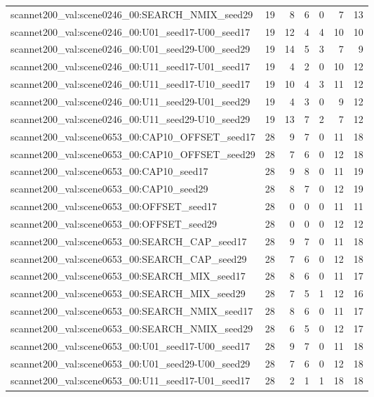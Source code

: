 \begin{table}[t]
\begin{tabular}{lrrrrrr}
scannet200\_val:scene0246\_00:SEARCH\_NMIX\_seed29 & 19 & 8 & 6 & 0 & 7 & 13 \\
scannet200\_val:scene0246\_00:U01\_seed17-U00\_seed17 & 19 & 12 & 4 & 4 & 10 & 10 \\
scannet200\_val:scene0246\_00:U01\_seed29-U00\_seed29 & 19 & 14 & 5 & 3 & 7 & 9 \\
scannet200\_val:scene0246\_00:U11\_seed17-U01\_seed17 & 19 & 4 & 2 & 0 & 10 & 12 \\
scannet200\_val:scene0246\_00:U11\_seed17-U10\_seed17 & 19 & 10 & 4 & 3 & 11 & 12 \\
scannet200\_val:scene0246\_00:U11\_seed29-U01\_seed29 & 19 & 4 & 3 & 0 & 9 & 12 \\
scannet200\_val:scene0246\_00:U11\_seed29-U10\_seed29 & 19 & 13 & 7 & 2 & 7 & 12 \\
scannet200\_val:scene0653\_00:CAP10\_OFFSET\_seed17 & 28 & 9 & 7 & 0 & 11 & 18 \\
scannet200\_val:scene0653\_00:CAP10\_OFFSET\_seed29 & 28 & 7 & 6 & 0 & 12 & 18 \\
scannet200\_val:scene0653\_00:CAP10\_seed17 & 28 & 9 & 8 & 0 & 11 & 19 \\
scannet200\_val:scene0653\_00:CAP10\_seed29 & 28 & 8 & 7 & 0 & 12 & 19 \\
scannet200\_val:scene0653\_00:OFFSET\_seed17 & 28 & 0 & 0 & 0 & 11 & 11 \\
scannet200\_val:scene0653\_00:OFFSET\_seed29 & 28 & 0 & 0 & 0 & 12 & 12 \\
scannet200\_val:scene0653\_00:SEARCH\_CAP\_seed17 & 28 & 9 & 7 & 0 & 11 & 18 \\
scannet200\_val:scene0653\_00:SEARCH\_CAP\_seed29 & 28 & 7 & 6 & 0 & 12 & 18 \\
scannet200\_val:scene0653\_00:SEARCH\_MIX\_seed17 & 28 & 8 & 6 & 0 & 11 & 17 \\
scannet200\_val:scene0653\_00:SEARCH\_MIX\_seed29 & 28 & 7 & 5 & 1 & 12 & 16 \\
scannet200\_val:scene0653\_00:SEARCH\_NMIX\_seed17 & 28 & 8 & 6 & 0 & 11 & 17 \\
scannet200\_val:scene0653\_00:SEARCH\_NMIX\_seed29 & 28 & 6 & 5 & 0 & 12 & 17 \\
scannet200\_val:scene0653\_00:U01\_seed17-U00\_seed17 & 28 & 9 & 7 & 0 & 11 & 18 \\
scannet200\_val:scene0653\_00:U01\_seed29-U00\_seed29 & 28 & 7 & 6 & 0 & 12 & 18 \\
scannet200\_val:scene0653\_00:U11\_seed17-U01\_seed17 & 28 & 2 & 1 & 1 & 18 & 18 \\

\end{tabular}
\end{table}
